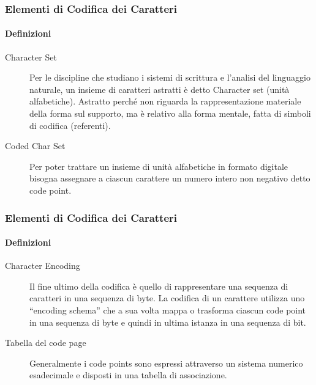 \begin{frame}
	\frametitle{Elementi di Codifica dei Caratteri}
	\framesubtitle{Definizioni}
	\addtocounter{nframe}{1}


	\begin{description}
		\item [Character Set] Per le discipline che studiano i sistemi di scrittura e l'analisi del linguaggio naturale, un insieme di caratteri astratti è detto Character set (unità alfabetiche). Astratto perché non riguarda la rappresentazione materiale della forma sul supporto, ma è relativo alla forma mentale, fatta di simboli di codifica (referenti).
		\item [Coded Char Set] Per poter trattare un insieme di unità alfabetiche in formato digitale bisogna assegnare a ciascun carattere un numero intero non negativo detto code point.
		
	\end{description}

\end{frame}

\begin{frame}
	\frametitle{Elementi di Codifica dei Caratteri}
	\framesubtitle{Definizioni}
	\addtocounter{nframe}{1}


	\begin{description}
		\item [Character Encoding]  Il fine ultimo della codifica è quello di rappresentare una sequenza di caratteri in una sequenza di byte. La codifica di un carattere utilizza uno ``encoding schema'' che a sua volta mappa o trasforma ciascun code point in una sequenza di byte e quindi in ultima istanza in una sequenza di bit. 
		\item [Tabella del code page] Generalmente i code points sono espressi attraverso un sistema numerico esadecimale e disposti in una tabella di associazione.
	\end{description}

\end{frame}


